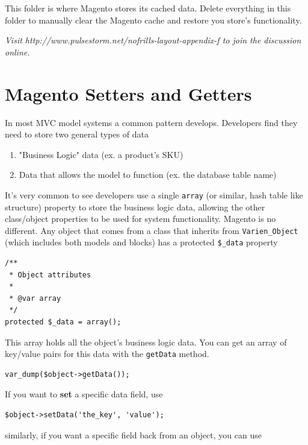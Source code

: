 \documentclass[oneside]{book}
\begin{document}
This folder is where Magento stores its cached data. Delete everything in this folder to manually clear the Magento cache and restore you store's functionality.

\emph{Visit http://www.pulsestorm.net/nofrills-layout-appendix-f to join the discussion online.}
\chapter{Magento Setters and Getters}
In most MVC model systems a common pattern develops.  Developers find they need to store two general types of data

\begin{enumerate}
\item "Business Logic" data (ex. a product's SKU)
\item Data that allows the model to function (ex. the database table name)
\end{enumerate}


It's very common to see developers use a single \footnotesize\texttt{array} \normalsize  (or similar, hash table like structure) property to store the business logic data, allowing the other class/object properties to be used for system functionality.  Magento is no different.  Any object that comes from a class that inherits from \footnotesize\texttt{Varien\_Object} \normalsize  (which includes both models and blocks) has a protected \footnotesize\texttt{\$\_data} \normalsize  property

\begin{lstlisting}
/**
 * Object attributes
 *
 * @var array
 */
protected $_data = array();

\end{lstlisting}


This array holds all the object's business logic data.  You can get an array of key/value pairs for this data with the \footnotesize\texttt{getData} \normalsize  method.

\begin{lstlisting}
var_dump($object->getData());

\end{lstlisting}


If you want to \textbf{set} a specific data field, use

\begin{lstlisting}
$object->setData('the_key', 'value');

\end{lstlisting}


similarly, if you want a specific field back from an object, you can use
\end{document}
